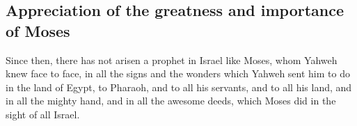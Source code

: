 \hypertarget{appreciation-of-the-greatness-and-importance-of-moses}{%
\subsection{Appreciation of the greatness and importance of
Moses}\label{appreciation-of-the-greatness-and-importance-of-moses}}

 Since then, there has not arisen a prophet in Israel
like Moses, whom Yahweh knew face to face,  in all the
signs and the wonders which Yahweh sent him to do in the land of Egypt,
to Pharaoh, and to all his servants, and to all his land,
 and in all the mighty hand, and in all the awesome
deeds, which Moses did in the sight of all Israel.
